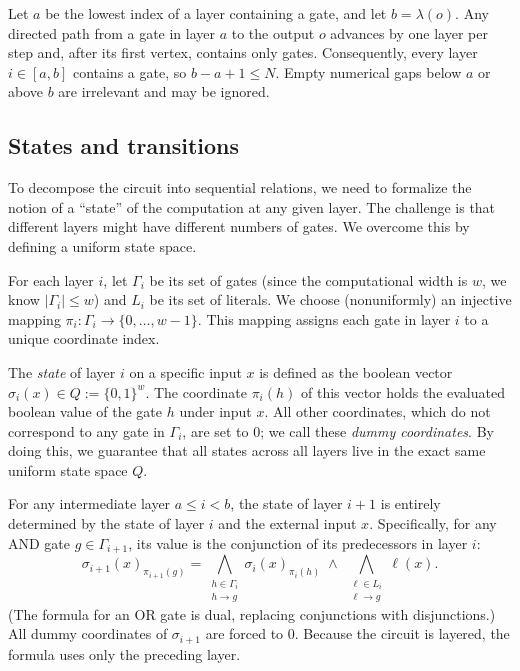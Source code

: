 \documentclass[11pt]{article}
\theoremstyle{definition}
\theoremstyle{remark}
\newcommand{\layer}{\lambda}
\begin{document}
Let $a$ be the lowest index of a layer containing a gate, and let $b=\layer(o)$. Any directed path from a gate in layer $a$ to the output $o$ advances by one layer per step and, after its first vertex, contains only gates. Consequently, every layer $i \in [a,b]$ contains a gate, so $b-a+1 \le N$. Empty numerical gaps below $a$ or above $b$ are irrelevant and may be ignored.

\subsection{States and transitions}\label{sec:states}

To decompose the circuit into sequential relations, we need to formalize the notion of a ``state'' of the computation at any given layer. The challenge is that different layers might have different numbers of gates. We overcome this by defining a uniform state space.

For each layer $i$, let $\Gamma_i$ be its set of gates (since the computational width is $w$, we know $|\Gamma_i|\le w$) and $L_i$ be its set of literals. We choose (nonuniformly) an injective mapping $\pi_i\colon \Gamma_i\to\{0,\dots,w-1\}$. This mapping assigns each gate in layer $i$ to a unique coordinate index.

The \emph{state} of layer $i$ on a specific input $x$ is defined as the boolean vector $\sigma_i(x)\in Q:=\{0,1\}^{w}$. The coordinate $\pi_i(h)$ of this vector holds the evaluated boolean value of the gate $h$ under input $x$. All other coordinates, which do not correspond to any gate in $\Gamma_i$, are set to $0$; we call these \emph{dummy coordinates}. By doing this, we guarantee that all states across all layers live in the exact same uniform state space $Q$.

For any intermediate layer $a\le i<b$, the state of layer $i+1$ is entirely determined by the state of layer $i$ and the external input $x$. Specifically, for any $\mathrm{AND}$ gate $g \in \Gamma_{i+1}$, its value is the conjunction of its predecessors in layer $i$:
\[
\sigma_{i+1}(x)_{\pi_{i+1}(g)}
=\bigwedge_{\substack{h\in \Gamma_i\\ h\to g}} \sigma_i(x)_{\pi_i(h)}
\;\wedge\;
\bigwedge_{\substack{\ell\in L_i\\ \ell\to g}} \ell(x).
\]
(The formula for an $\mathrm{OR}$ gate is dual, replacing conjunctions with disjunctions.) All dummy coordinates of $\sigma_{i+1}$ are forced to $0$. Because the circuit is layered, the formula uses only the preceding layer.
\end{document}
